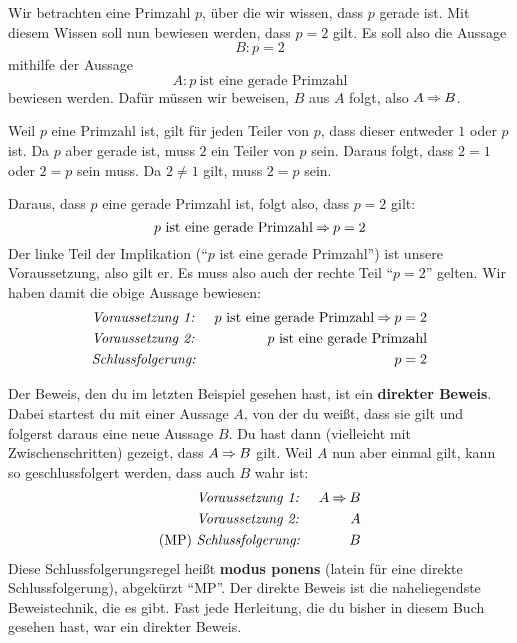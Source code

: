 \documentclass[../../main.tex]{subfiles}
\begin{document}
\begin{example}{}
    Wir betrachten eine Primzahl $p$, über die wir wissen, dass $p$ gerade ist. Mit diesem Wissen soll nun bewiesen werden, dass $p=2$ gilt. Es soll also die Aussage
    \[B:p=2\]
    mithilfe der Aussage
    \[A:p~\text{ist~eine~gerade~Primzahl}\]
    bewiesen werden. Dafür müssen wir beweisen, $B$ aus $A$ folgt, also $A\mathbin{\Rightarrow} B$.

    Weil $p$ eine Primzahl ist, gilt für jeden Teiler von $p$, dass dieser entweder $1$ oder $p$ ist. Da $p$ aber gerade ist, muss $2$ ein Teiler von $p$ sein. Daraus folgt, dass $2=1$ oder $2=p$ sein muss. Da $2\neq 1$ gilt, muss $2=p$ sein.

    Daraus, dass $p$ eine gerade Primzahl ist, folgt also, dass $p=2$ gilt:
    \[p~\text{ist~eine~gerade~Primzahl} \mathbin{\Rightarrow} p=2\]
    Der linke Teil der Implikation (\enquote{$p$ ist eine gerade Primzahl}) ist unsere Voraussetzung, also gilt er. Es muss also auch der rechte Teil \enquote{$p=2$} gelten. Wir haben damit die obige Aussage bewiesen:
    \begin{align*}
        &\text{\emph{Voraussetzung~1:}}~&p~\text{ist~eine~gerade~Primzahl} \mathbin{\Rightarrow} p=2\\
        &\text{\emph{Voraussetzung~2:}}~&p~\text{ist~eine~gerade~Primzahl}\\
        &\text{\emph{Schlussfolgerung:}}~&p=2
    \end{align*}
\end{example}

Der Beweis, den du im letzten Beispiel gesehen hast, ist ein \textbf{direkter Beweis}. Dabei startest du mit einer Aussage $A$, von der du weißt, dass sie gilt und folgerst daraus eine neue Aussage $B$. Du hast dann (vielleicht mit Zwischenschritten) gezeigt, dass $A \mathbin{\Rightarrow} B$ gilt. Weil $A$ nun aber einmal gilt, kann so geschlussfolgert werden, dass auch $B$ wahr ist:
\begin{align*}
    &\text{\emph{Voraussetzung~1:}}~&A \mathbin{\Rightarrow} B\\
    &\text{\emph{Voraussetzung~2:}}~&A\\
    (\text{MP})~&\text{\emph{Schlussfolgerung:}}~&B
\end{align*}
Diese Schlussfolgerungsregel heißt \textbf{modus ponens} (latein für eine direkte Schlussfolgerung), abgekürzt \enquote{MP}. Der direkte Beweis ist die naheliegendste Beweistechnik, die es gibt. Fast jede Herleitung, die du bisher in diesem Buch gesehen hast, war ein direkter Beweis.
\end{document}
